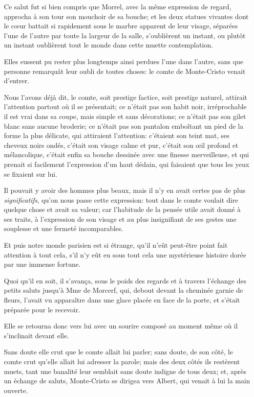 Ce salut fut si bien compris que Morrel, avec la même expression de regard, approcha à son tour son mouchoir de sa bouche; et les deux statues vivantes dont le cœur battait si rapidement sous le marbre apparent de leur visage, séparées l'une de l'autre par toute la largeur de la salle, s'oublièrent un instant, ou plutôt un instant oublièrent tout le monde dans cette muette contemplation. 

Elles eussent pu rester plus longtemps ainsi perdues l'une dans l'autre, sans que personne remarquât leur oubli de toutes choses: le comte de Monte-Cristo venait d'entrer. 

Nous l'avons déjà dit, le comte, soit prestige factice, soit prestige naturel, attirait l'attention partout où il se présentait; ce n'était pas son habit noir, irréprochable il est vrai dans sa coupe, mais simple et sans décorations; ce n'était pas son gilet blanc sans aucune broderie; ce n'était pas son pantalon emboîtant un pied de la forme la plus délicate, qui attiraient l'attention: c'étaient son teint mat, ses cheveux noirs ondés, c'était son visage calme et pur, c'était son œil profond et mélancolique, c'était enfin sa bouche dessinée avec une finesse merveilleuse, et qui prenait si facilement l'expression d'un haut dédain, qui faisaient que tous les yeux se fixaient sur lui. 

Il pouvait y avoir des hommes plus beaux, mais il n'y en avait certes pas de plus \textit{significatifs}, qu'on nous passe cette expression: tout dans le comte voulait dire quelque chose et avait sa valeur; car l'habitude de la pensée utile avait donné à ses traits, à l'expression de son visage et au plus insignifiant de ses gestes une souplesse et une fermeté incomparables. 

Et puis notre monde parisien est si étrange, qu'il n'eût peut-être point fait attention à tout cela, s'il n'y eût eu sous tout cela une mystérieuse histoire dorée par une immense fortune. 

Quoi qu'il en soit, il s'avança, sous le poids des regards et à travers l'échange des petits saluts jusqu'à Mme de Morcerf, qui, debout devant la cheminée garnie de fleurs, l'avait vu apparaître dans une glace placée en face de la porte, et s'était préparée pour le recevoir. 

Elle se retourna donc vers lui avec un sourire composé au moment même où il s'inclinait devant elle. 

Sans doute elle crut que le comte allait lui parler; sans doute, de son côté, le comte crut qu'elle allait lui adresser la parole; mais des deux côtés ils restèrent muets, tant une banalité leur semblait sans doute indigne de tous deux; et, après un échange de saluts, Monte-Cristo se dirigea vers Albert, qui venait à lui la main ouverte. 

